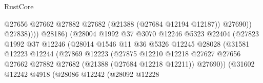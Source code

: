 \begin{lexlean}{RustCore}
\begin{coremodule}
                                                    @27656
                                                    @27662
                                                    @27882
                                                    @27682
                                                    (@21388 (@27684 @12194 @12187))
                                                    @27690))
                                                @27838))))
                                        @28186)
                                      (@28004
                                        @1992
                                        @37
                                        @3070
                                        @12246
                                        @5323
                                        @22404
                                        (@27823
                                          @1992
                                          @37
                                          @12246
                                          (@28014
                                            @1546
                                            @11
                                            @36
                                            @5326
                                            @12245
                                            @28028
                                            (@31581
                                              @12223
                                              @12244
                                              (@27869
                                                @12223
                                                (@27875
                                                  @12210
                                                  @12218
                                                  @27627
                                                  @27656
                                                  @27662
                                                  @27882
                                                  @27682
                                                  (@21388 (@27684 @12218 @12211))
                                                  @27690))
                                              (@31602
                                                @12242
                                                @4918
                                                (@28086
                                                  @12242
                                                  (@28092
                                                    @12228

\end{coremodule}
\end{lexlean}
